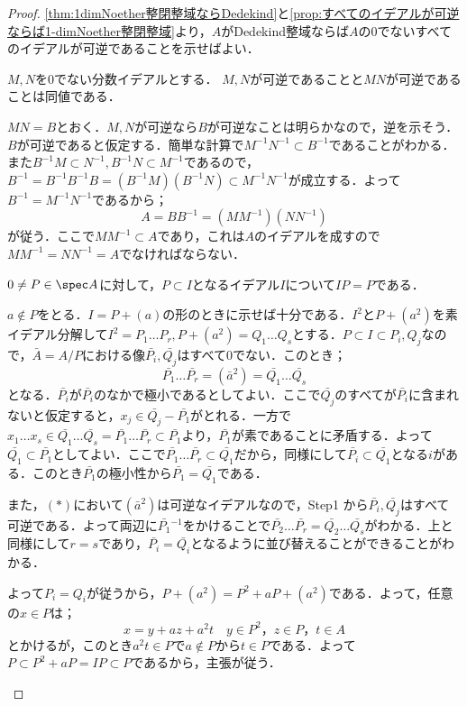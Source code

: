 \begin{proof}
	\ref{thm:1dimNoether整閉整域ならDedekind}と\ref{prop:すべてのイデアルが可逆ならば1-dimNoether整閉整域}より，$A$がDedekind整域ならば$A$の0でないすべてのイデアルが可逆であることを示せばよい．%
	
	\begin{step}
		\item $M,N$を0でない分数イデアルとする． $M,N$が可逆であることと$MN$が可逆であることは同値である．
		
		$MN=B$とおく．$M,N$が可逆なら$B$が可逆なことは明らかなので，逆を示そう．$B$が可逆であると仮定する．簡単な計算で$M^{-1}N^{-1}\subset B^{-1}$であることがわかる．また$B^{-1}M\subset N^{-1},B^{-1}N\subset M^{-1}$であるので，$B^{-1}=B^{-1}B^{-1}B=(B^{-1}M)(B^{-1}N)\subset M^{-1}N^{-1}$が成立する．よって$B^{-1}=M^{-1}N^{-1}$であるから；
		\[A=BB^{-1}=(MM^{-1})(NN^{-1})\]
		が従う．ここで$MM^{-1}\subset A$であり，これは$A$のイデアルを成すので$MM^{-1}=NN^{-1}=A$でなければならない．
	
		\item $0\neq P\in\spec A$に対して，$P\subset I$となるイデアル$I$について$IP=P$である．
		
		$a\not\in P$をとる．$I=P+(a)$の形のときに示せば十分である．$I^2$と$P+(a^2)$を素イデアル分解して$I^2=P_1\dots P_r,P+(a^2)=Q_1\dots Q_s$とする．$P\subset I\subset P_i,Q_j$なので，$\bar{A}=A/P$における像$\bar{P_i},\bar{Q_j}$はすべて0でない．このとき；
		\[\bar{P_1}\dots\bar{P_r}=(\bar{a}^2)=\bar{Q_1}\dots\bar{Q_s}\tag{$\ast$}\]
		となる．$\bar{P_i}$が$\bar{P_i}$のなかで極小であるとしてよい．ここで$\bar{Q_j}$のすべてが$\bar{P_i}$に含まれないと仮定すると，$x_j\in \bar{Q_j}-\bar{P_1}$がとれる．一方で$x_1\dots x_s\in \bar{Q_1}\dots\bar{Q_s}=\bar{P_1}\dots\bar{P_r}\subset\bar{P_1}$より，$\bar{P_1}$が素であることに矛盾する．よって$\bar{Q_1}\subset\bar{P_1}$としてよい．ここで$\bar{P_1}\dots\bar{P_r}\subset\bar{Q_1}$だから，同様にして$\bar{P_i}\subset\bar{Q_1}$となる$i$がある．このとき$\bar{P_1}$の極小性から$\bar{P_1}=\bar{Q_1}$である．
		
		また，$(\ast)$において$(\bar{a}^2)$は可逆なイデアルなので，Step1 から$\bar{P_i},\bar{Q_j}$はすべて可逆である．よって両辺に$\bar{P_1}{}^{-1}$をかけることで$\bar{P_2}\dots\bar{P_r}=\bar{Q_2}\dots\bar{Q_s}$がわかる．上と同様にして$r=s$であり，$\bar{P_i}=\bar{Q_i}$となるように並び替えることができることがわかる．
		
		よって$P_i=Q_i$が従うから，$P+(a^2)=P^2+aP+(a^2)$である．よって，任意の$x\in P$は；
		\[x=y+az+a^2t\quad y\in P^2，z\in P，t\in A\]
		とかけるが，このとき$a^2t\in P$で$a\not\in P$から$t\in P$である．よって$P\subset P^2+aP=IP\subset P$であるから，主張が従う．
		

\end{step}
\end{proof}
